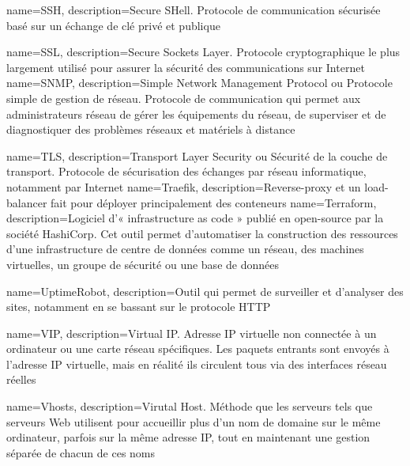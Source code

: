 {
    name=SSH,
    description={Secure SHell. Protocole de communication sécurisée basé sur un échange de clé privé et publique}
}

{
    name=SSL,
    description={Secure Sockets Layer. Protocole cryptographique le plus largement utilisé pour assurer la sécurité des communications sur Internet}
}
{
    name=SNMP,
    description={Simple Network Management Protocol ou Protocole simple de gestion de réseau. Protocole de communication qui permet aux administrateurs réseau de gérer les équipements du réseau, de superviser et de diagnostiquer des problèmes réseaux et matériels à distance}
}

{
    name=TLS,
    description={Transport Layer Security ou Sécurité de la couche de transport. Protocole de sécurisation des échanges par réseau informatique, notamment par Internet}
}
{
    name=Traefik,
    description={Reverse-proxy et un load-balancer fait pour déployer principalement des conteneurs}
}
{
    name=Terraform,
    description={Logiciel d'« infrastructure as code » publié en open-source par la société HashiCorp. Cet outil permet d'automatiser la construction des ressources d'une infrastructure de centre de données comme un réseau, des machines virtuelles, un groupe de sécurité ou une base de données}
}

{
    name=UptimeRobot,
    description={Outil qui permet de surveiller et d'analyser des sites, notamment en se bassant sur le protocole HTTP}
}

{
    name=VIP,
    description={Virtual IP. Adresse IP virtuelle non connectée à un ordinateur ou une carte réseau spécifiques. Les paquets entrants sont envoyés à l'adresse IP virtuelle, mais en réalité ils circulent tous via des interfaces réseau réelles}
}

{
    name=Vhosts,
    description={Virutal Host. Méthode que les serveurs tels que serveurs Web utilisent pour accueillir plus d'un nom de domaine sur le même ordinateur, parfois sur la même adresse IP, tout en maintenant une gestion séparée de chacun de ces noms}
}


